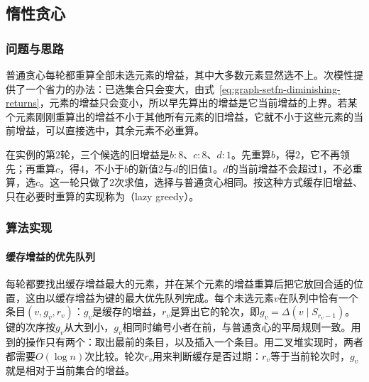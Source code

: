 \subsection{惰性贪心}
\label{sec:graph-setfn-lazy-greedy}

\subsubsection{问题与思路}

普通贪心每轮都重算全部未选元素的增益，其中大多数元素显然选不上。次模性提供了一个省力的办法：已选集合只会变大，由式~\eqref{eq:graph-setfn-diminishing-returns}，元素的增益只会变小，所以早先算出的增益是它当前增益的上界。若某个元素刚刚重算出的增益不小于其他所有元素的旧增益，它就不小于这些元素的当前增益，可以直接选中，其余元素不必重算。

在实例的第$2$轮，三个候选的旧增益是$b{:}8$、$c{:}8$、$d{:}1$。先重算$b$，得$2$，它不再领先；再重算$c$，得$4$，不小于$b$的新值$2$与$d$的旧值$1$。$d$的当前增益不会超过$1$，不必重算，选$c$。这一轮只做了$2$次求值，选择与普通贪心相同。按这种方式缓存旧增益、只在必要时重算的实现称为（lazy greedy）。

\subsubsection{算法实现}

\paragraph{缓存增益的优先队列}
每轮都要找出缓存增益最大的元素，并在某个元素的增益重算后把它放回合适的位置，这由以缓存增益为键的最大优先队列完成。每个未选元素$v$在队列中恰有一个条目$(v,g_v,r_v)$：$g_v$是缓存的增益，$r_v$是算出它的轮次，即$g_v=\Delta(v\mid S_{r_v-1})$。键的次序按$g_v$从大到小，$g_v$相同时编号小者在前，与普通贪心的平局规则一致。用到的操作只有两个：取出最前的条目，以及插入一个条目。用二叉堆实现时，两者都需要$O(\log n)$次比较。轮次$r_v$用来判断缓存是否过期：$r_v$等于当前轮次时，$g_v$就是相对于当前集合的增益。

